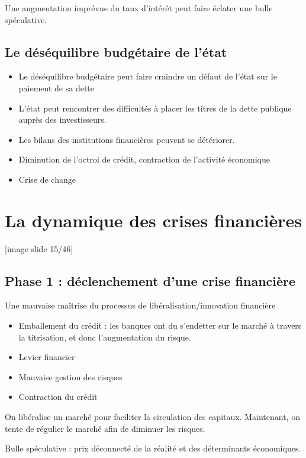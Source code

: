 	Une augmentation imprévue du taux d'intérêt peut faire éclater une bulle spéculative.

	\subsection{Le déséquilibre budgétaire de l'état}
	
	\begin{itemize}
		\item Le déséquilibre budgétaire peut faire craindre un défaut de l'état sur le paiement de sa dette 
		\item L'état peut rencontrer des difficultés à placer les titres de la dette publique auprès des investisseurs. 
		\item Les bilans des institutions financières peuvent se détériorer. 
		\item Diminution de l'octroi de crédit, contraction de l'activité économique
		\item Crise de change
	\end{itemize}


\section{La dynamique des crises financières}

	[image slide 15/46]
	
	\subsection{Phase 1 : déclenchement d'une crise financière}
	
	Une mauvaise maîtrise du processus de libéralisation/innovation financière 
\begin{itemize}
	\item Emballement du crédit : les banques ont du s'endetter sur le marché à travers la titrisation, et donc l'augmentation du risque.
	\item Levier financier 
	\item Mauvaise gestion des risques 
	\item Contraction du crédit 
\end{itemize}

	On libéralise un marché pour faciliter la circulation des capitaux. Maintenant, on tente de régulier le marché afin de diminuer les risques.

	Bulle spéculative : prix déconnecté de la réalité et des déterminants économiques.
	
